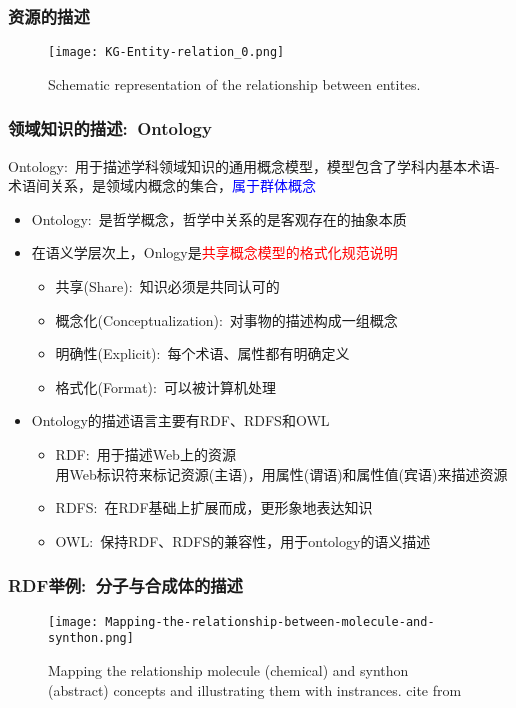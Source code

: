 \frame
{
	\frametitle{资源的描述}
\begin{figure}[h!]
\centering
\vskip -8pt
\texttt{[image: KG-Entity-relation\_0.png]}
\caption{\tiny\textrm{Schematic representation of the relationship between entites.}}%
\label{Fig:KG-Entity-relations}
\end{figure}
}

\frame
{
	\frametitle{领域知识的描述:~\textrm{Ontology}}
	\textrm{Ontology}:~用于描述学科领域知识的通用概念模型，模型包含了学科内基本术语-术语间关系，是领域内概念的集合，\textcolor{blue}{属于群体概念}
	\begin{itemize}
		\item \textrm{Ontology}:~是哲学概念，哲学中关系的是客观存在的抽象本质
		\item 在语义学层次上，\textrm{Onlogy}是\textcolor{red}{共享概念模型的格式化规范说明}
	\begin{itemize}
		\item 共享\textrm{(Share)}:~知识必须是共同认可的
		\item 概念化\textrm{(Conceptualization)}:~对事物的描述构成一组概念
		\item 明确性\textrm{(Explicit)}:~每个术语、属性都有明确定义
		\item 格式化\textrm{(Format)}:~可以被计算机处理
	\end{itemize}
\item \textrm{Ontology}的描述语言主要有\textrm{RDF}、\textrm{RDFS}和\textrm{OWL}
	\begin{itemize}
		\item \textrm{RDF}:~用于描述\textrm{Web}上的资源\\
			用\textrm{Web}标识符来标记资源(主语)，用属性(谓语)和属性值(宾语)来描述资源
		\item \textrm{RDFS}:~在\textrm{RDF}基础上扩展而成，更形象地表达知识
		\item \textrm{OWL}:~保持\textrm{RDF}、\textrm{RDFS}的兼容性，用于\textrm{ontology}的语义描述
	\end{itemize}
	\end{itemize}
}

\frame
{
	\frametitle{\textrm{RDF}举例:~分子与合成体的描述}
\begin{figure}[h!]
\centering
\vskip -8pt
\texttt{[image: Mapping-the-relationship-between-molecule-and-synthon.png]}
\caption{\tiny\textrm{Mapping the relationship molecule (chemical) and synthon (abstract) concepts and illustrating them with instrances. cite from\cite{ACR56-128_2023}}}%
\label{Fig:Mapping-relationship-molecule-synthon}
\end{figure}
}

